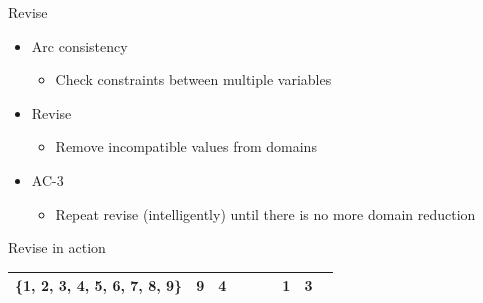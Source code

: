 \documentclass{beamer}
\begin{document}
\begin{frame}{Revise}

\begin{itemize}
\item Arc consistency
\begin{itemize}
    \item Check constraints between multiple variables
\end{itemize}
\item Revise
\begin{itemize}
    \item Remove incompatible values from domains
\end{itemize}
\item AC-3
\begin{itemize}
    \item Repeat revise (intelligently) until there is no more domain reduction
\end{itemize}
\end{itemize}

\end{frame}

\begin{frame}{Revise in action}

\begin{table}[htbp]
    \begin{center}

        \begin{tabular}{|c|c|c|c|c|c|c|c|c|}
        \hline
        \cellcolor[gray]{0.7}\{1, 2, 3, 4, 5, 6, 7, 8, 9\} & 9 & 4 &  &  &  & 1 & 3 & \\
        \hline
        \end{tabular}
    \end{center}
\end{table}
\end{frame}
\end{document}
